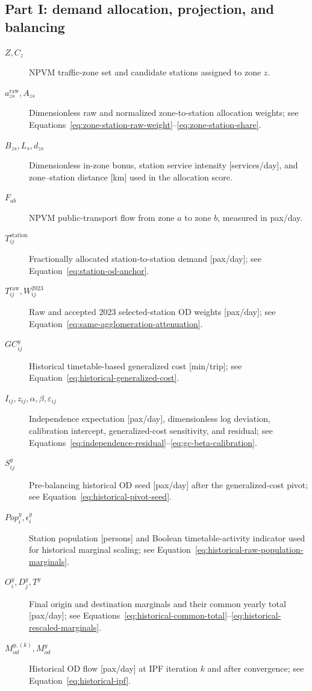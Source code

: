 \documentclass[preprint,12pt]{elsarticle}
\begin{document}
\subsection*{Part I: demand allocation, projection, and balancing}
\begin{description}
    \item[$Z,C_z$] NPVM traffic-zone set and candidate stations assigned to zone \(z\).
    \item[$a^{\mathrm{raw}}_{zs},A_{zs}$] Dimensionless raw and normalized zone-to-station allocation weights; see Equations~\eqref{eq:zone-station-raw-weight}--\eqref{eq:zone-station-share}.
    \item[$B_{zs},L_s,d_{zs}$] Dimensionless in-zone bonus, station service intensity [services/day], and zone--station distance [km] used in the allocation score.
    \item[$F_{ab}$] NPVM public-transport flow from zone \(a\) to zone \(b\), measured in pax/day.
    \item[$T^{\mathrm{station}}_{ij}$] Fractionally allocated station-to-station demand [pax/day]; see Equation~\eqref{eq:station-od-anchor}.
    \item[$T^{\mathrm{raw}}_{ij},W^{2023}_{ij}$] Raw and accepted 2023 selected-station OD weights [pax/day]; see Equation~\eqref{eq:same-agglomeration-attenuation}.
    \item[$GC^y_{ij}$] Historical timetable-based generalized cost [min/trip]; see Equation~\eqref{eq:historical-generalized-cost}.
    \item[$I_{ij},z_{ij},\alpha,\beta,\varepsilon_{ij}$] Independence expectation [pax/day], dimensionless log deviation, calibration intercept, generalized-cost sensitivity, and residual; see Equations~\eqref{eq:independence-residual}--\eqref{eq:gc-beta-calibration}.
    \item[$S^y_{ij}$] Pre-balancing historical OD seed [pax/day] after the generalized-cost pivot; see Equation~\eqref{eq:historical-pivot-seed}.
    \item[$Pop^y_i,\epsilon_i^y$] Station population [persons] and Boolean timetable-activity indicator used for historical marginal scaling; see Equation~\eqref{eq:historical-raw-population-marginals}.
    \item[$O_i^y,D_j^y,T^y$] Final origin and destination marginals and their common yearly total [pax/day]; see Equations~\eqref{eq:historical-common-total}--\eqref{eq:historical-rescaled-marginals}.
    \item[$M_{od}^{y,(k)},M_{od}^y$] Historical OD flow [pax/day] at IPF iteration \(k\) and after convergence; see Equation~\eqref{eq:historical-ipf}.
\end{description}
\end{document}
